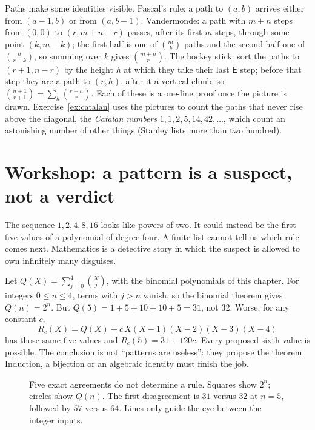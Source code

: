 Paths make some identities visible. Pascal's rule: a path to $(a,b)$ arrives either from $(a-1,b)$ or from $(a,b-1)$. Vandermonde: a path
with $m+n$ steps from $(0,0)$ to $(r,m+n-r)$ passes, after its first $m$ steps, through some point $(k,m-k)$; the first half is one of $\binom mk$
paths and the second half one of $\binom n{r-k}$, so summing over $k$ gives $\binom{m+n}r$. The hockey stick: sort the paths to $(r+1,n-r)$ by
the height $h$ at which they take their last $\mathsf E$ step; before that step they are a path to $(r,h)$, after it a vertical climb, so
$\binom{n+1}{r+1}=\sum_{h}\binom{r+h}r$. Each of these is a one-line proof once the picture is drawn. Exercise~\ref{ex:catalan} uses the
pictures to count the paths that never rise above the diagonal, the \emph{Catalan numbers} $1,1,2,5,14,42,\dots$, which count an astonishing number
of other things (Stanley lists more than two hundred).


\section{Workshop: a pattern is a suspect, not a verdict}
The sequence $1,2,4,8,16$ looks like powers of two. It could instead be the first five values of a polynomial of degree four. A finite list cannot tell us which rule comes next. Mathematics is a detective story in which the suspect is allowed to own infinitely many disguises.

\begin{examplex}
Let $Q(X)=\sum_{j=0}^4\binom Xj$, with the binomial polynomials of this chapter. For integers $0\le n\le4$, terms with $j>n$ vanish, so the binomial theorem gives $Q(n)=2^n$. But $Q(5)=1+5+10+10+5=31$, not $32$. Worse, for any constant $c$,
\[
R_c(X)=Q(X)+c\,X(X-1)(X-2)(X-3)(X-4)
\]
has those same five values and $R_c(5)=31+120c$. Every proposed sixth value is possible. The conclusion is not ``patterns are useless'': they propose the theorem. Induction, a bijection or an algebraic identity must finish the job.
\end{examplex}

\begin{figure}[ht]\centering{}
\caption{Five exact agreements do not determine a rule. Squares show $2^n$; circles show $Q(n)$. The first disagreement is $31$ versus $32$ at $n=5$, followed by $57$ versus $64$. Lines only guide the eye between the integer inputs.}\end{figure}

